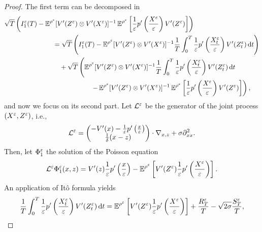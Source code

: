 \documentclass[10pt]{article}
\begin{document}
\begin{proof}
	 The first term can be decomposed in
	\begin{equation} \label{eq:decomposition_first_term}
	\begin{aligned}
	\sqrt{T}&\left( I_1^\epl(T) - \E^{\rho^\epl} [ V'(Z^\epl) \otimes V'(X^\epl) ]^{-1} \E^{\rho^\epl} \left [ \frac{1}{\epl} p' \left ( \frac{X^\epl}{\epl} \right ) V'(Z^\epl) \right ] \right) \\
	&\hspace{2cm}= \sqrt{T} \left( I_1^\epl(T) - \E^{\rho^\epl} [ V'(Z^\epl) \otimes V'(X^\epl) ]^{-1} \frac1T \int_0^T \frac{1}{\epl} p' \left ( \frac{X^\epl_t}{\epl} \right ) V'(Z^\epl_t) \dd t \right) \\
	&\hspace{2cm} \quad + \sqrt{T} \left(\E^{\rho^\epl} [ V'(Z^\epl) \otimes V'(X^\epl) ]^{-1} \frac1T \int_0^T \frac{1}{\epl} p' \left ( \frac{X^\epl_t}{\epl} \right ) V'(Z^\epl_t) \dd t \right. \\
	&\hspace{4cm} \left. - \E^{\rho^\epl} [ V'(Z^\epl) \otimes V'(X^\epl) ]^{-1} \E^{\rho^\epl} \left [ \frac{1}{\epl} p' \left ( \frac{X^\epl}{\epl} \right ) V'(Z^\epl) \right ] \right),
	\end{aligned}
	\end{equation}
	and now we focus on its second part. Let $\mathcal L^\varepsilon$ be the generator of the joint process $(X^\varepsilon, Z^\varepsilon)$, i.e.,
	\begin{equation}
		\mathcal L^\varepsilon = \begin{pmatrix} -V'(x) - \frac1{\varepsilon} p'\left(\frac{x}{\varepsilon}\right) \\ \frac1\delta (x - z)	\end{pmatrix} \cdot \nabla_{x, z} + \sigma \partial^2_{xx}.
	\end{equation}
	Then, let $\Phi_1^\varepsilon$ the solution of the Poisson equation
	\begin{equation}
		\mathcal L^\varepsilon \Phi_1^\varepsilon(x, z) = V'(z)\frac1{\varepsilon} p'\left(\frac{x}{\varepsilon}\right) - \operatorname{\mathbb{E}}^{\rho^\varepsilon}\left[V'(Z^\varepsilon)\frac1{\varepsilon} p'\left(\frac{X^\varepsilon}{\varepsilon}\right)\right].
	\end{equation}	
	An application of Itô formula \cite[Remark 6.17]{PaS08} yields
	\begin{equation}
		\frac{1}{T} \int_0^T \frac{1}{\varepsilon} p' \left ( \frac{X^\varepsilon_t}{\varepsilon} \right ) V'(Z^\varepsilon_t) \,\mathrm{d} t = \operatorname{\mathbb{E}}^{\rho^\varepsilon}\left[V'(Z^\varepsilon)\frac1{\varepsilon} p'\left(\frac{X^\varepsilon}{\varepsilon}\right)\right] + \frac{R_T^\varepsilon}{T} - \sqrt{2\sigma}\frac{S^\varepsilon_T}{T},
	\end{equation}

\end{proof}
\end{document}

